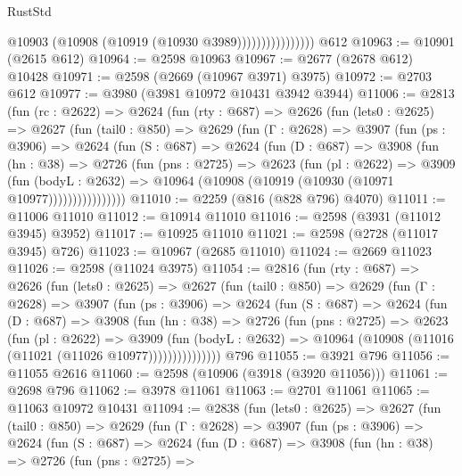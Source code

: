 \begin{lexlean}{RustStd}
\begin{coremodule}
                            @10903 (@10908 (@10919 (@10930 @3989))))))))))))))))
    @612
@10963 := @10901 (@2615 @612)
@10964 := @2598 @10963
@10967 := @2677 (@2678 @612) @10428
@10971 := @2598 (@2669 (@10967 @3971) @3975)
@10972 := @2703 @612
@10977 := @3980 (@3981 @10972 @10431 @3942 @3944)
@11006 := @2813
    (fun (rc : @2622) =>
    @2624
      (fun (rty : @687) =>
      @2626
        (fun (lets0 : @2625) =>
        @2627
          (fun (tail0 : @850) =>
          @2629
            (fun (Γ : @2628) =>
            @3907
              (fun (ps : @3906) =>
              @2624
                (fun (S : @687) =>
                @2624
                  (fun (D : @687) =>
                  @3908
                    (fun (hn : @38) =>
                    @2726
                      (fun (pns : @2725) =>
                      @2623
                        (fun (pl : @2622) =>
                        @3909
                          (fun (bodyL : @2632) =>
                          @10964 (@10908 (@10919 (@10930 (@10971 @10977))))))))))))))))
@11010 := @2259 (@816 (@828 @796) @4070)
@11011 := @11006 @11010
@11012 := @10914 @11010
@11016 := @2598 (@3931 (@11012 @3945) @3952)
@11017 := @10925 @11010
@11021 := @2598 (@2728 (@11017 @3945) @726)
@11023 := @10967 (@2685 @11010)
@11024 := @2669 @11023
@11026 := @2598 (@11024 @3975)
@11054 := @2816
    (fun (rty : @687) =>
    @2626
      (fun (lets0 : @2625) =>
      @2627
        (fun (tail0 : @850) =>
        @2629
          (fun (Γ : @2628) =>
          @3907
            (fun (ps : @3906) =>
            @2624
              (fun (S : @687) =>
              @2624
                (fun (D : @687) =>
                @3908
                  (fun (hn : @38) =>
                  @2726
                    (fun (pns : @2725) =>
                    @2623
                      (fun (pl : @2622) =>
                      @3909
                        (fun (bodyL : @2632) =>
                        @10964 (@10908 (@11016 (@11021 (@11026 @10977)))))))))))))))
    @796
@11055 := @3921 @796
@11056 := @11055 @2616
@11060 := @2598 (@10906 (@3918 (@3920 @11056)))
@11061 := @2698 @796
@11062 := @3978 @11061
@11063 := @2701 @11061
@11065 := @11063 @10972 @10431
@11094 := @2838
    (fun (lets0 : @2625) =>
    @2627
      (fun (tail0 : @850) =>
      @2629
        (fun (Γ : @2628) =>
        @3907
          (fun (ps : @3906) =>
          @2624
            (fun (S : @687) =>
            @2624
              (fun (D : @687) =>
              @3908
                (fun (hn : @38) =>
                @2726
                  (fun (pns : @2725) =>

\end{coremodule}
\end{lexlean}
